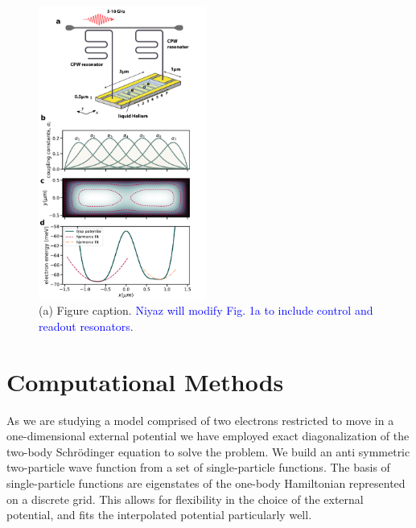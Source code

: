 \documentclass[twocolumn,superscriptaddress,unsortedaddress,
 amsmath,amssymb,
 aps,
]{revtex4-2}
\begin{document}
\begin{figure}
\includegraphics[width=0.49\textwidth]{figure1.pdf}
\caption{\label{fig1} (a) Figure caption. \textcolor{blue}{Niyaz will modify Fig. 1a to include control and readout resonators.}}
\end{figure}

\section{Computational Methods} %
    As we are studying a model comprised of two electrons restricted to move in a
    one-dimensional external potential we have employed exact diagonalization of the
    two-body Schrödinger equation to solve the problem.
    We build an anti symmetric two-particle wave function from a set of single-particle
    functions.
    The basis of single-particle functions are eigenstates of the one-body Hamiltonian
    represented on a discrete grid.
    This allows for flexibility in the choice of the external potential, and fits the
    interpolated potential particularly well.
\end{document}
